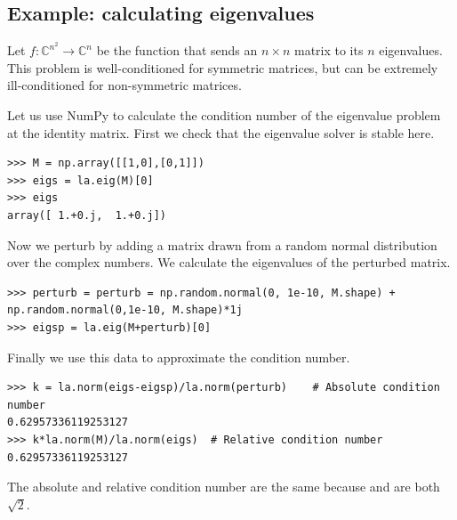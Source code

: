 
\subsection*{Example: calculating eigenvalues}
Let $f:\mathbb{C}^{n^2} \rightarrow \mathbb{C}^n$ be the function that sends an $n \times n$ matrix to its $n$ eigenvalues.
This problem is well-conditioned for symmetric matrices, but can be extremely ill-conditioned for non-symmetric matrices.

Let us use NumPy to calculate the condition number of the eigenvalue problem at the identity matrix.
First we check that the eigenvalue solver is stable here.
\begin{lstlisting}
>>> M = np.array([[1,0],[0,1]])
>>> eigs = la.eig(M)[0]
>>> eigs
array([ 1.+0.j,  1.+0.j])
\end{lstlisting}
Now we perturb  by adding a matrix drawn from a random normal distribution over the complex numbers.
We calculate the eigenvalues of the perturbed matrix.
\begin{lstlisting}
>>> perturb = perturb = np.random.normal(0, 1e-10, M.shape) + np.random.normal(0,1e-10, M.shape)*1j
>>> eigsp = la.eig(M+perturb)[0]
\end{lstlisting}
Finally we use this data to approximate the condition number.
\begin{lstlisting}
>>> k = la.norm(eigs-eigsp)/la.norm(perturb)	# Absolute condition number
0.62957336119253127
>>> k*la.norm(M)/la.norm(eigs)	# Relative condition number
0.62957336119253127
\end{lstlisting}
The absolute and relative condition number are the same because  and  are both $\sqrt{2}$.


